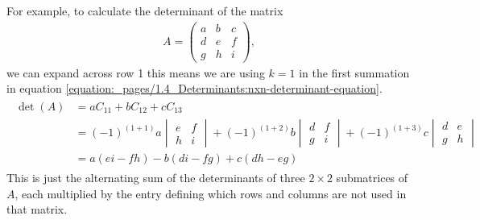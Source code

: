 \documentclass[letterpaper,10pt,english]{jupyterBook}
\begin{document}
\sphinxAtStartPar
For example, to calculate the determinant of the matrix
\begin{equation*}
\begin{split} A = \begin{pmatrix} a & b & c \\ d & e & f \\ g & h & i \end{pmatrix}, \end{split}
\end{equation*}
\sphinxAtStartPar
we can expand across row 1 \sphinxhyphen{} this means we are using \(k = 1\) in the first summation in equation \eqref{equation:_pages/1.4_Determinants:nxn-determinant-equation}.
\begin{equation*}
\begin{split} \begin{align*}
    \det(A) &= a C_{11} + b C_{12} + cC_{13} \\
    &= (-1)^{(1+1)} a \begin{vmatrix} e & f \\ h & i \end{vmatrix}
    + (-1)^{(1+2)} b \begin{vmatrix}d & f \\ g & i \end{vmatrix}
    + (-1)^{(1+3)} c \begin{vmatrix}d & e \\ g & h \end{vmatrix} \\
    &= a(ei - fh) - b(di - fg) + c(dh - eg)
\end{align*} \end{split}
\end{equation*}
\sphinxAtStartPar
This is just the alternating sum of the determinants of three \(2 \times 2\) submatrices of \(A\), each multiplied by the entry defining which rows and columns are not used in that matrix.
\end{document}

